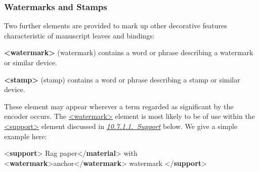\subsubsection[{Watermarks and Stamps}]{Watermarks and Stamps}\label{mswat}\par
Two further elements are provided to mark up other decorative features characteristic of manuscript leaves and bindings: 
\begin{sansreflist}
  
\item [\textbf{<watermark>}] (watermark) contains a word or phrase describing a watermark or similar device.
\item [\textbf{<stamp>}] (stamp) contains a word or phrase describing a stamp or similar device.
\end{sansreflist}
\par
These element may appear wherever a term regarded as significant by the encoder occurs. The \hyperref[TEI.watermark]{<watermark>} element is most likely to be of use within the \hyperref[TEI.support]{<support>} element discussed in \textit{\hyperref[msph1sup]{10.7.1.1.\ Support}} below. We give a simple example here: \par\bgroup{}\exampleFont \begin{shaded}\noindent\mbox{}{<\textbf{support}>}\mbox{}\newline 
{}Rag\mbox{}\newline 
\hspace*{1em}\hspace*{1em} paper{</\textbf{material}>} with {<\textbf{watermark}>}anchor{</\textbf{watermark}>} watermark\mbox{}\newline 
{</\textbf{support}>}\end{shaded}\egroup\par \par
